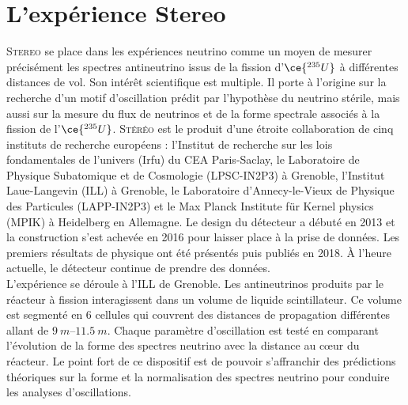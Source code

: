 

\chapter{L'expérience Stereo} 
\label{chap:chapitre_2} 


\minitoc 

\newpage 

\lettrine{S}{tereo} se place dans les expériences neutrino comme un moyen de mesurer précisément les spectres antineutrino issus de la fission d'$\ce{^{235}U}$ à différentes distances de vol. Son intérêt scientifique est multiple. Il porte à l'origine sur la recherche d'un motif d'oscillation prédit par l'hypothèse du neutrino stérile, mais aussi sur la mesure du flux de neutrinos et de la forme spectrale associés à la fission de l'$\ce{^{235}U}$. \textsc{Stéréo} est le produit d'une étroite collaboration de cinq instituts de recherche européens : l'\og Institut de recherche sur les lois fondamentales de l'univers \fg{} (Irfu) du CEA Paris-Saclay, le \og Laboratoire de Physique Subatomique et de Cosmologie \fg{} (LPSC-IN2P3) à Grenoble, l’\og Institut Laue-Langevin \fg{} (ILL) à Grenoble, le \og Laboratoire d’Annecy-le-Vieux de Physique des Particules \fg{} (LAPP-IN2P3) et le \og Max Planck Institute f\"ur Kernel physics \fg{} (MPIK) à Heidelberg en Allemagne. Le design du détecteur a débuté en 2013 et la construction s'est achevée en 2016 pour laisser place à la prise de données. Les premiers résultats de physique ont été présentés puis publiés en 2018. \`A l'heure actuelle, le détecteur continue de prendre des données.\\ 

L'expérience se déroule à l'ILL de Grenoble. Les antineutrinos produits par le réacteur à fission interagissent dans un volume de liquide scintillateur. Ce volume est segmenté en 6 cellules qui couvrent des distances de propagation différentes allant de $\SIrange{9}{11,5}{m}$. Chaque paramètre d'oscillation est testé en comparant l'évolution de la forme des spectres neutrino avec la distance au c\oe ur du réacteur. Le point fort de ce dispositif est de pouvoir s'affranchir des prédictions théoriques sur la forme et la normalisation des spectres neutrino pour conduire les analyses d'oscillations.\\ 

